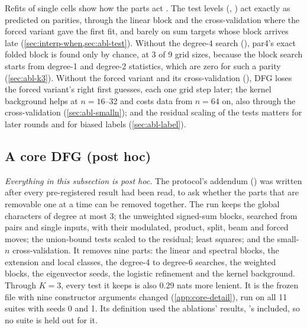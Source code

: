 Refits of single cells show how the parts act . The test levels (, ) act exactly as predicted on parities, through the linear block and the cross-validation where the forced variant gave the first fit, and barely on sum targets whose block arrives late (\cref{sec:interp-when,sec:abl-test}). Without the degree-4 search (), par4's exact folded block is found only by chance, at 3 of 9 grid sizes, because the block search starts from degree-1 and degree-2 statistics, which are zero for such a parity (\cref{sec:abl-k3}). Without the forced variant and its cross-validation (), DFG loses the forced variant's right first guesses, each one grid step later; the kernel background helps at $n=16$--32 and costs data from $n=64$ on, also through the cross-validation (\cref{sec:abl-smalln}); and the residual scaling of the tests matters for later rounds and for biased labels (\cref{sec:abl-label}).

\subsection{A core DFG (post hoc)}\label{sec:core}

\emph{Everything in this subsection is post hoc.} The protocol's addendum () was written after every pre-registered result had been read, to ask whether the parts that are removable one at a time can be removed together. The  run keeps the global characters of degree at most 3; the unweighted signed-sum blocks, searched from pairs and single inputs, with their modulated, product, split, beam and forced moves; the union-bound tests scaled to the residual; least squares; and the small-$n$ cross-validation. It removes nine parts: the linear and spectral blocks, the extension and local classes, the degree-4 to degree-6 searches, the weighted blocks, the eigenvector seeds, the logistic refinement and the kernel background. Through $K=3$, every test it keeps is also 0.29 nats more lenient. It is the frozen file with nine constructor arguments changed (\cref{app:core-detail}), run on all 11 suites with seeds 0 and 1. Its definition used the ablations' results, 's included, so no suite is held out for it.

